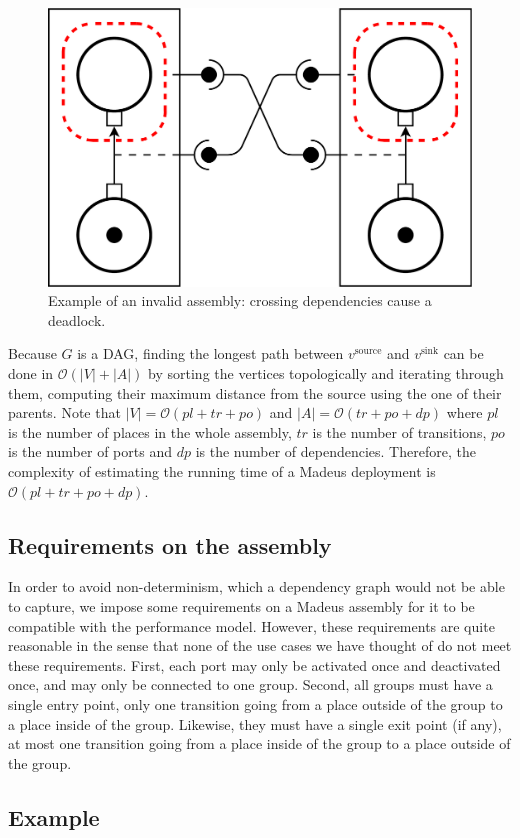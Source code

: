 \begin{figure}[h]
  \begin{center}
    \includegraphics[width=0.7\linewidth]{./images/deadlock.pdf}
  \end{center}
  \caption{Example of an invalid assembly: crossing dependencies cause a deadlock.}
  \label{fig:deadlock}
\end{figure}

Because $G$ is a DAG, finding the longest path between $v^\text{source}$
and $v^\text{sink}$ can be done in $\mathcal{O}(|V|+|A|)$ by sorting the
vertices topologically and iterating through them, computing their maximum
distance from the source using the one of their parents. Note that
$|V| = \mathcal{O}(pl+tr+po)$ and $|A| = \mathcal{O}(tr+po+dp)$ where $pl$
is the number of places in the whole assembly, $tr$ is the number of
transitions, $po$ is the number of ports and $dp$ is the number of
dependencies. Therefore, the complexity of estimating the running time of
a Madeus deployment is $\mathcal{O}(pl+tr+po+dp)$.


\subsection{Requirements on the assembly}

In order to avoid non-determinism, which a dependency graph would not be
able to capture, we impose some requirements on a Madeus assembly
for it to be compatible with the performance model. However, these
requirements are quite reasonable in the sense that none of the use
cases we have thought of do not meet these requirements.
%
First, each port may only be activated once and deactivated once, and
may only be connected to one group. Second, all groups must have a
single entry point, \ie only one transition going from a place outside
of the group to a place inside of the group. Likewise, they must have a
single exit point (if any), \ie at most one transition going from a
place inside of the group to a place outside of the group.

\subsection{Example}


